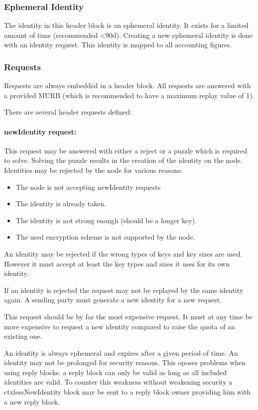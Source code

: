 \subsubsection{Ephemeral Identity}
The identity in this header block is an ephemeral identity. It exists for a limited amount of time (recommended <90d). Creating a new ephemeral identity is done with an identity request. This identity is mapped to all accounting figures.

\subsubsection{Requests\label{sec:request}}
Requests are always embedded in a header block. All requests are answered with a provided MURB (which is recommended to have a maximum replay value of 1).

There are several header requests defined:

\paragraph{newIdentity request:} This request may be answered with either a reject or a puzzle which is required to solve. Solving the puzzle results in the creation of the identity on the node. Identities may be rejected by the node for various reasons:

\begin{itemize}
	\item The node is not accepting newIdentity requests
	\item The identity is already taken.
	\item The identity is not strong enough (should be a longer key).
	\item The used encryption scheme is not supported by the node.
\end{itemize}

An identity may be rejected if the wrong types of keys and key sizes are used. However it must accept at least the key types and sizes it uses for its own identity.

If an identity is rejected the request may not be replayed by the same identity again. A sending party must generate a new identity for a new request. 

This request should be by far the most expensive request. It must at any time be more expensive to request a new identity compared to raise the quota of an existing one.

An identity is always ephemeral and expires after a given period of time. An identity may not be prolonged for security reasons. This oposes problems when using reply blocks. a reply block can only be valid as long as all included identities are valid. To counter this weakness without weakening security a ctxlessNewIdentity block may be sent to a reply block owner providing him with a new reply block.

